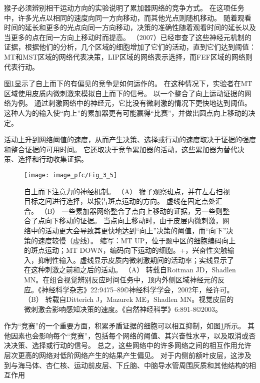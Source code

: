 猴子必须辨别相干运动方向的实验说明了累加器网络的竞争方式。
在这项任务中，许多光点以相同的速度向同一方向移动，而其他光点则随机移动。
随着观看时间的延长和更多的光点向同一方向移动，决策的准确性随着观看时间的延长以及当更多的点在同一方向上移动时而提高。\cite{schall2001neural}
\cite{GoldandShadlen}（2007）已经审查了这些神经元机制的证据，根据他们的分析，几个区域的细胞增加了它们的活动，直到它们达到阈值：MT和MST区域的网络代表决策，LIP区域的网络表示选择，而FEF区域的网络则代表行动\cite{kim1999neural}。\par


图\ref{fig:3_5}显示了自上而下的有偏见的竞争是如何运作的。
在这种情况下，实验者在MT区域使用皮质内微刺激来模拟自上而下的信号。
以一个整合了向上运动证据的网络为例。
通过刺激网络中的神经元，它比没有微刺激的情况下更快地达到阈值。
这种人为的输入使“向上”的累加器更有可能赢得“比赛”，并做出圆点向上移动的决定。\par


活动上升到网络阈值的速度，从而产生决策、选择或行动的速度取决于证据的强度和整合证据的可用时间。
它还取决于竞争累加器的活动，这些累加器为替代决策、选择和行动收集证据。\par


\begin{figure}[!htb]
	\centering
	\texttt{[image: image\_pfc/Fig\_3\_5]}
	\caption*{自上而下注意力的神经机制。
		（A） 猴子观察斑点，并在左右扫视目标之间进行选择，以报告斑点运动的方向。
		虚线在固定点处汇合。
		（B） 一些累加器网络整合了点向上移动的证据，另一些则整合了点向下移动的证据。
		当点向上移动时，由于皮层内微刺激，网络中的活动更大会导致其更快地达到“向上”决策的阈值，而“向下”决策的速度较慢（虚线）。
		缩写：MT UP，位于颞中区的细胞编码向上的斑点运动；MT DOWN，编码向下运动的细胞。+，兴奋性突触输入，抑制性输入。虚线显示皮质内微刺激期间的活动率；实线显示了在这种刺激之前和之后的活动。
		（A） 转载自Roitman JD，Shadlen MN。在组合视觉辨别反应时间任务中，顶内外侧区域神经元的反应。《神经科学杂志》22:9475–89©神经科学学会，2002年，经许可。
		（B） 转载自Ditterich J，Mazurek ME，Shadlen MN。视觉皮层的微刺激会影响感知决策的速度。《自然神经科学》6:891-8©2003。}
	\label{fig:3_5}
\end{figure}


作为“竞赛”的一个重要方面，积累矛盾证据的细胞可以相互抑制，如图\ref{fig:3_5}所示。
其他因素也会影响每个“竞赛”，包括每个网络的阈值、其兴奋性水平，以及取消或否决决策、选择或行动的信号。
总之，这些网络中的许多网络之间的相互作用允许层次更高的网络对低阶网络产生的结果产生偏见。
对于内侧前额叶皮层，这涉及到与海马体、杏仁核、运动前皮层、下丘脑、中脑导水管周围灰质和其他结构的相互作用\par


